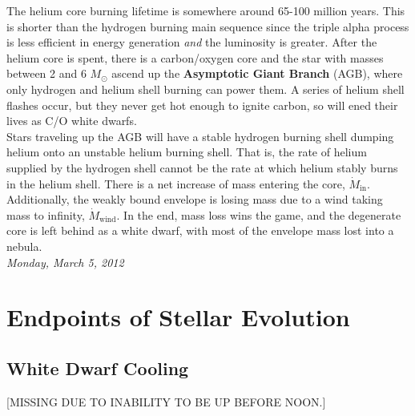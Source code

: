 \documentclass[10pt]{article}
\numberwithin{equation}{section}
\newcommand{\n}{\noindent}
\begin{document}
    \n The helium core burning lifetime is somewhere around 65-100
    million years. This is shorter than the hydrogen burning main
    sequence since the triple alpha process is less efficient in
    energy generation \emph{and} the luminosity is greater. After the
    helium core is spent, there is a carbon/oxygen core and the star
    with masses between 2 and 6 $M_\odot$ ascend up the
    \textbf{Asymptotic Giant Branch} (AGB), where only hydrogen and helium
    shell burning can power them. A series of helium shell flashes
    occur, but they never get hot enough to ignite
    carbon, so will ened their lives as C/O white dwarfs.\\

    \n Stars traveling up the AGB will have a stable hydrogen burning
    shell dumping helium onto an unstable helium burning shell. That
    is, the rate of helium supplied by the hydrogen shell cannot be
    the rate at which helium stably burns in the helium shell. There
    is a net increase of mass entering the core,
    $\dot{M}_{\mathrm{in}}$. Additionally, the weakly bound envelope
    is losing mass due to a wind taking mass to infinity,
    $\dot{M}_{\mathrm{wind}}$. In the end, mass loss wins the game,
    and the degenerate core is left behind as a white dwarf, with most
    of the envelope mass lost into a nebula.\\

    \n\textit{Monday, March 5, 2012}

    \section{Endpoints of Stellar Evolution}
    \label{sec:endp-stell-evol}

    \subsection{White Dwarf Cooling}
    \label{sec:white-dwarf-cooling}

    [MISSING DUE TO INABILITY TO BE UP BEFORE NOON.]\\
\end{document}
